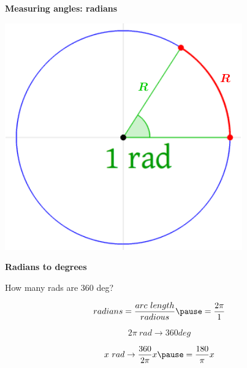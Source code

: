 \documentclass[]{beamer}
\begin{document}
  \begin{frame}

\textbf{Measuring angles: radians}
\vspace{3mm}

\begin{center}
   \includegraphics[height=2.in]{images/radians.png}
 \end{center}

 \end{frame}

  \begin{frame}

   \textbf{Radians to degrees}
   \vspace{3mm}


   How many rads are 360 deg?

   \pause
   \vspace{3mm}


\begin{equation*}
   radians=\frac{arc~length}{radious}\pause =\frac{2\pi}{1}
\end{equation*}



\pause

\begin{equation*}
   2\pi~rad\rightarrow 360 deg
\end{equation*}

\begin{equation*}
   x~rad \rightarrow \frac{360}{2\pi} x\pause = \frac{180}{\pi} x
\end{equation*}


\end{frame}
   
\end{document}
